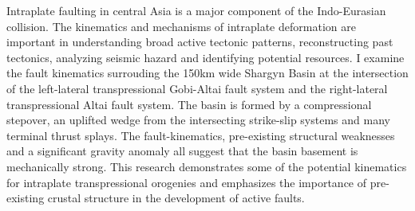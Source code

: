 \begin{abstractpage}
Intraplate faulting in central Asia is a major component of the Indo-Eurasian collision. The kinematics and mechanisms of intraplate deformation are important in understanding broad active tectonic patterns, reconstructing past tectonics, analyzing seismic hazard and identifying potential resources. I examine the fault kinematics surrouding the 150km wide Shargyn Basin at the intersection of the left-lateral transpressional Gobi-Altai fault system and the right-lateral transpressional Altai fault system. The basin is formed by a compressional stepover, an uplifted wedge from the intersecting strike-slip systems and many terminal thrust splays. The fault-kinematics, pre-existing structural weaknesses and a significant gravity anomaly all suggest that the basin basement is mechanically strong. This research demonstrates some of the potential kinematics for intraplate transpressional orogenies and emphasizes the importance of pre-existing crustal structure in the development of active faults.
\end{abstractpage}
